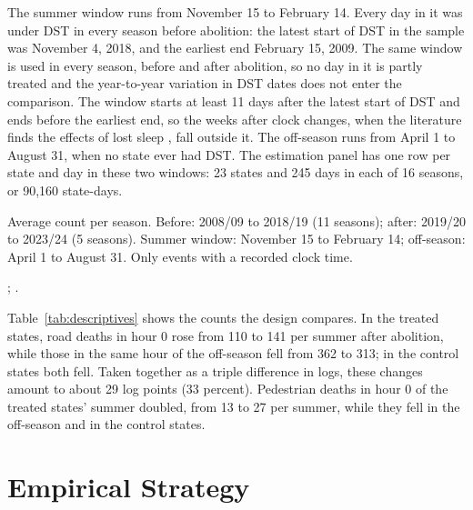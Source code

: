 The summer window runs from November 15 to February 14. Every day in it was under DST in every season before abolition: the latest start of DST in the sample was November 4, 2018, and the earliest end February 15, 2009. The same window is used in every season, before and after abolition, so no day in it is partly treated and the year-to-year variation in DST dates does not enter the comparison. The window starts at least 11 days after the latest start of DST and ends before the earliest end, so the weeks after clock changes, when the literature finds the effects of lost sleep \citep{smith2016spring, gillmore2025daylight}, fall outside it. The off-season runs from April 1 to August 31, when no state ever had DST. The estimation panel has one row per state and day in these two windows: 23 states and 245 days in each of 16 seasons, or 90,160 state-days.

\begin{table}[tbp]
  \caption{Events per Summer by Group, Window, and Period}
  \label{tab:descriptives}
  \centering\footnotesize\setlength{\tabcolsep}{3.5pt}
  
  \begin{tablenotes}[Notes]
  Average count per season. Before: 2008/09 to 2018/19 (11 seasons); after: 2019/20 to 2023/24 (5 seasons). Summer window: November 15 to February 14; off-season: April 1 to August 31. Only events with a recorded clock time.
  \end{tablenotes}
  \begin{tablenotes}[Sources]
  \citet{datasus2025sim}; \citet{prf2025dados}.
  \end{tablenotes}
\end{table}

Table~\ref{tab:descriptives} shows the counts the design compares. In the treated states, road deaths in hour 0 rose from 110 to 141 per summer after abolition, while those in the same hour of the off-season fell from 362 to 313; in the control states both fell. Taken together as a triple difference in logs, these changes amount to about 29 log points (33 percent). Pedestrian deaths in hour 0 of the treated states' summer doubled, from 13 to 27 per summer, while they fell in the off-season and in the control states.

\section{Empirical Strategy}\label{sec:design}

